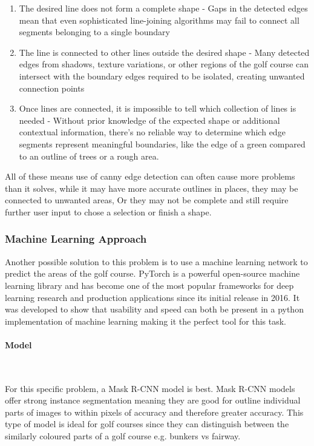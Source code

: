 \documentclass[final]{cmpreport_02}
\begin{document}
\begin{enumerate}
	\item The desired line does not form a complete shape - Gaps in the detected edges mean that even sophisticated line-joining algorithms may fail to connect all segments belonging to a single boundary

	\item The line is connected to other lines outside the desired shape - Many detected edges from shadows, texture variations, or other regions of the golf course can intersect with the boundary edges required to be isolated, creating unwanted connection points

	\item Once lines are connected, it is impossible to tell which collection of lines is needed - Without prior knowledge of the expected shape or additional contextual information, there's no reliable way to determine which edge segments represent meaningful boundaries, like the edge of a green compared to an outline of trees or a rough area.
\end{enumerate}
All of these means use of canny edge detection can often cause more problems than it solves, while it may have more accurate outlines in places, they may be connected to unwanted areas, Or they may not be complete and still require further user input to chose a selection or finish a shape.

\subsubsection{Machine Learning Approach}
Another possible solution to this problem is to use a machine learning network to predict the areas of the golf course.
PyTorch \citep{paszke2019pytorch} is a powerful open-source machine learning library and has become one of the most popular frameworks for deep learning research and production applications since its initial release in 2016.
It was developed to show that usability and speed can both be present in a python implementation of machine learning making it the perfect tool for this task.

\paragraph{Model} \

For this specific problem, a Mask R-CNN model is best.
Mask R-CNN models offer strong instance segmentation meaning they are good for outline individual parts of images to within pixels of accuracy and therefore greater accuracy.
This type of model is ideal for golf courses since they can distinguish between the similarly coloured parts of a golf course e.g. bunkers vs fairway.
\end{document}
